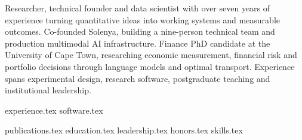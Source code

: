 \documentclass[11pt, a4paper]{awesome-cv}
\newcommand*{\sectiondir}{sections/}
\newcommand*{\cvprofile}[1]{%
  \begin{center}
    \begin{minipage}{0.97\textwidth}
      \fontsize{9pt}{1.35em}\bodyfontlight\color{text}#1
    \end{minipage}
  \end{center}
  \vspace{-1mm}
}
\begin{document}
\makecvheader

\cvprofile{Researcher, technical founder and data scientist with over
  seven years of experience turning quantitative ideas into working
  systems and measurable outcomes. Co-founded Solenya, building a
  nine-person technical team and production multimodal AI
  infrastructure. Finance PhD candidate at the University of Cape
  Town, researching economic measurement, financial risk and
  portfolio decisions through language models and optimal transport.
  Experience spans experimental design, research software,
postgraduate teaching and institutional leadership.}

{experience.tex}
{software.tex}

\newpage

{publications.tex}
{education.tex}
{leadership.tex}
{honors.tex}
{skills.tex}
\end{document}
